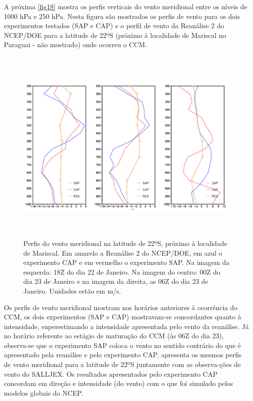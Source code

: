 A próxima \autoref{fig18} mostra os perfis verticais do vento meridional entre os níveis de 1000 hPa e 250 hPa. Nesta figura são mostrados os perfis de vento para os dois experimentos testados (SAP e CAP) e o perfil de vento da Reanálise 2 do NCEP/DOE para a latitude de 22ºS (próximo à localidade de Mariscal no Paraguai - não mostrado) onde ocorreu o CCM. 

\begin{figure}[!hbp]
\includegraphics[height=9.8cm]{./figs/perfilvento.png}
\caption{Perfis do vento meridional na latitude de 22ºS, próximo à localidade de Mariscal. Em amarelo a Reanálise 2 do NCEP/DOE, em azul o experimento CAP e em vermelho o experimento SAP. Na imagem da esquerda: 18Z do dia 22 de Janeiro. Na imagem do centro: 00Z do dia 23 de Janeiro e na imagem da direita, as 06Z do dia 23 de Janeiro. Unidades estão em m/s.}
\label{fig18}
\end{figure}

Os perfis de vento meridional mostram nos horários anteriores à ocorrência do CCM, os dois experimentos (SAP e CAP) mostravam-se concordantes quanto à intensidade, superestimando a intensidade apresentada pelo vento da reanálise. Já no horário referente ao estágio de maturação do CCM (às 06Z do dia 23), observa-se que o experimento SAP coloca o vento no sentido contrário do que é apresentado pela reanálise e pelo experimento CAP.  apresenta os mesmos perfis de vento meridional para a latitude de 22ºS juntamente com as observa-ções de vento do SALLJEX. Os resultados apresentados pelo experimento CAP concordam em direção e intensidade (do vento) com o que foi simulado pelos modelos globais do NCEP.

